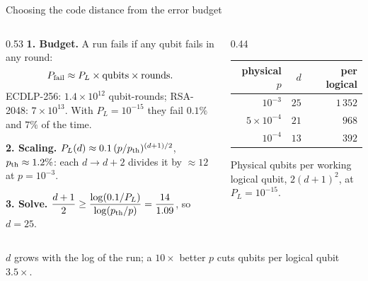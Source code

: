 \documentclass[aspectratio=169,11pt]{beamer}
\begin{document}
{
\begin{frame}[noframenumbering]{Choosing the code distance from the error budget}
  \begin{columns}[T,onlytextwidth]
    \begin{column}{0.53\textwidth}
      \footnotesize\setlength{\abovedisplayskip}{2pt}\setlength{\belowdisplayskip}{2pt}%
      \textbf{1. Budget.} A run fails if any qubit fails in any round:
      \[ P_{\rm fail}\approx P_L\times\text{qubits}\times\text{rounds}. \]
      ECDLP-256: $1.4\times10^{12}$ qubit-rounds; RSA-2048: $7\times10^{13}$. With $P_L=10^{-15}$ they fail $0.1\%$ and $7\%$ of the time.\par\vskip1mm
      \textbf{2. Scaling.} $P_L(d)\approx0.1\,(p/p_{\rm th})^{(d+1)/2}$, $p_{\rm th}\approx1.2\%$: each $d\to d+2$ divides it by ${\approx}12$ at $p=10^{-3}$.\par\vskip1mm
      \textbf{3. Solve.} $\dfrac{d+1}{2}\ge\dfrac{\log(0.1/P_L)}{\log(p_{\rm th}/p)}=\dfrac{14}{1.09}$, so $d=25$.
    \end{column}
    \begin{column}{0.44\textwidth}
      \centering\footnotesize
      \renewcommand{\arraystretch}{1.2}
      \begin{tabular}{@{}rrr@{}}
        \toprule
        physical $p$ & $d$ & per logical \\
        \midrule
        $10^{-3}$ & $25$ & $1\,352$ \\
        $5\times10^{-4}$ & $21$ & $968$ \\
        $10^{-4}$ & $13$ & $392$ \\
        \bottomrule
      \end{tabular}\par
      \vskip1.5mm\raggedright
      {\scriptsize Physical qubits per working logical qubit, $2(d+1)^2$, at $P_L=10^{-15}$.}
    \end{column}
  \end{columns}
  \vskip1mm
  \begin{takeaway}$d$ grows with the log of the run; a $10\times$ better $p$ cuts qubits per logical qubit $3.5\times$.\end{takeaway}
\end{frame}}
\end{document}
